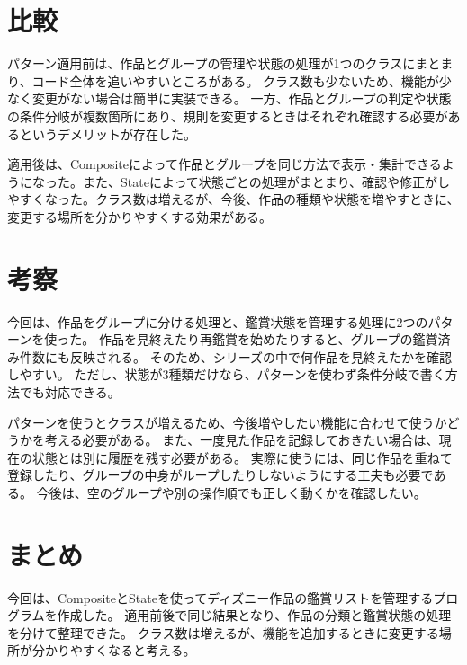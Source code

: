 \documentclass[dvipdfmx,a4paper,11pt]{jsarticle}
\begin{document}
\section{比較}
パターン適用前は、作品とグループの管理や状態の処理が1つのクラスにまとまり、コード全体を追いやすいところがある。
クラス数も少ないため、機能が少なく変更がない場合は簡単に実装できる。
一方、作品とグループの判定や状態の条件分岐が複数箇所にあり、規則を変更するときはそれぞれ確認する必要があるというデメリットが存在した。

適用後は、Compositeによって作品とグループを同じ方法で表示・集計できるようになった。また、Stateによって状態ごとの処理がまとまり、確認や修正がしやすくなった。クラス数は増えるが、今後、作品の種類や状態を増やすときに、変更する場所を分かりやすくする効果がある。

\section{考察}
今回は、作品をグループに分ける処理と、鑑賞状態を管理する処理に2つのパターンを使った。
作品を見終えたり再鑑賞を始めたりすると、グループの鑑賞済み件数にも反映される。
そのため、シリーズの中で何作品を見終えたかを確認しやすい。
ただし、状態が3種類だけなら、パターンを使わず条件分岐で書く方法でも対応できる。

パターンを使うとクラスが増えるため、今後増やしたい機能に合わせて使うかどうかを考える必要がある。
また、一度見た作品を記録しておきたい場合は、現在の状態とは別に履歴を残す必要がある。
実際に使うには、同じ作品を重ねて登録したり、グループの中身がループしたりしないようにする工夫も必要である。
今後は、空のグループや別の操作順でも正しく動くかを確認したい。

\section{まとめ}
今回は、CompositeとStateを使ってディズニー作品の鑑賞リストを管理するプログラムを作成した。
適用前後で同じ結果となり、作品の分類と鑑賞状態の処理を分けて整理できた。
クラス数は増えるが、機能を追加するときに変更する場所が分かりやすくなると考える。
\end{document}
